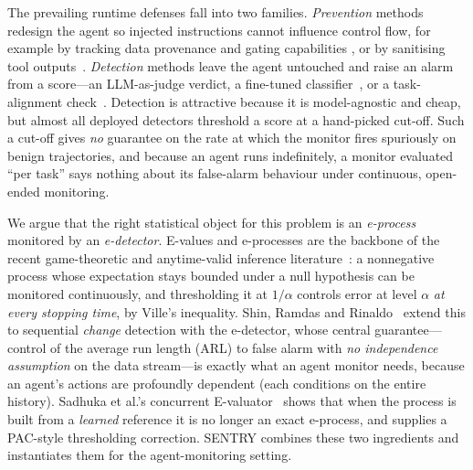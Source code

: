 \documentclass[10pt,journal,compsoc]{IEEEtran}
\theoremstyle{plain}
\theoremstyle{definition}
\begin{document}
The prevailing runtime defenses fall into two families. \emph{Prevention}
methods redesign the agent so injected instructions cannot influence control
flow, for example by tracking data provenance and gating capabilities
\cite{debenedetti2025camel}, or by sanitising tool
outputs~\cite{das2025commandsans}. \emph{Detection} methods leave the agent
untouched and raise an alarm from a score---an LLM-as-judge verdict, a
fine-tuned classifier~\cite{liu2025datasentinel}, or a task-alignment
check~\cite{jia2024taskshield}. Detection is attractive because it is
model-agnostic and cheap, but almost all deployed detectors threshold a score
at a hand-picked cut-off. Such a cut-off gives \emph{no} guarantee on the rate
at which the monitor fires spuriously on benign trajectories, and because an
agent runs indefinitely, a monitor evaluated ``per task'' says nothing about
its false-alarm behaviour under continuous, open-ended monitoring.

We argue that the right statistical object for this problem is an
\emph{e-process} monitored by an \emph{e-detector}. E-values and e-processes
are the backbone of the recent game-theoretic and anytime-valid inference
literature~\cite{ramdas2023gametheoretic,vovk2021evalues,grunwald2024safetesting}:
a nonnegative process whose expectation stays bounded under a null hypothesis
can be monitored continuously, and thresholding it at \(1/\alpha\) controls
error at level \(\alpha\) \emph{at every stopping time}, by Ville's
inequality. Shin, Ramdas and Rinaldo~\cite{shin2023edetectors} extend this to
sequential \emph{change} detection with the e-detector, whose central
guarantee---control of the average run length (ARL) to false alarm with
\emph{no independence assumption} on the data stream---is exactly what an agent
monitor needs, because an agent's actions are profoundly dependent (each
conditions on the entire history). Sadhuka et al.'s concurrent
E-valuator~\cite{sadhuka2025evaluator} shows that when the process is built
from a \emph{learned} reference it is no longer an exact e-process, and
supplies a PAC-style thresholding correction. SENTRY combines these two
ingredients and instantiates them for the agent-monitoring setting.
\end{document}
